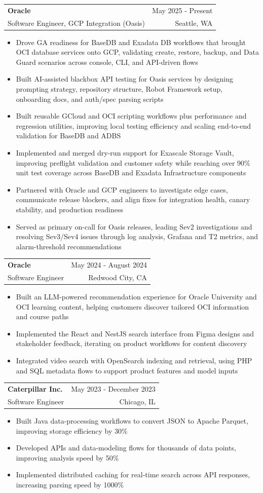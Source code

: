 \documentclass[letterpaper,11pt]{article}
\makeatletter
\newcommand{\resumeItem}[1]{
  \item\small{
    {#1 \vspace{-1pt}}
  }
}
\newcommand{\resumeSubheading}[4]{
  \vspace{-2pt}\item
    \begin{tabular*}{0.97\textwidth}[t]{l@{\extracolsep{\fill}}r}
      \textbf{#1} & #2 \\
      {\small#3} & {\small #4} \\
    \end{tabular*}\vspace{-7pt}
}
\newcommand{\resumeItemListStart}{\begin{itemize}[leftmargin=0.18in,itemsep=1pt,topsep=2pt]}
\newcommand{\resumeItemListEnd}{\end{itemize}\vspace{-5pt}}
\makeatother
\begin{document}
    \resumeSubheading
  {Oracle}{May 2025 - Present}
  {Software Engineer, GCP Integration (Oasis)}{Seattle, WA}
  \resumeItemListStart
    \resumeItem{Drove GA readiness for BaseDB and Exadata DB workflows that brought OCI database services onto GCP, validating create, restore, backup, and Data Guard scenarios across console, CLI, and API-driven flows}
    \resumeItem{Built AI-assisted blackbox API testing for Oasis services by designing prompting strategy, repository structure, Robot Framework setup, onboarding docs, and auth/spec parsing scripts}
    \resumeItem{Built reusable GCloud and OCI scripting workflows plus performance and regression utilities, improving local testing efficiency and scaling end-to-end validation for BaseDB and ADBS}
    \resumeItem{Implemented and merged dry-run support for Exascale Storage Vault, improving preflight validation and customer safety while reaching over 90\% unit test coverage across BaseDB and Exadata Infrastructure components}
    \resumeItem{Partnered with Oracle and GCP engineers to investigate edge cases, communicate release blockers, and align fixes for integration health, canary stability, and production readiness}
    \resumeItem{Served as primary on-call for Oasis releases, leading Sev2 investigations and resolving Sev3/Sev4 issues through log analysis, Grafana and T2 metrics, and alarm-threshold recommendations}
  \resumeItemListEnd

    \resumeSubheading
      {Oracle}{May 2024 - August 2024}
      {Software Engineer}{Redwood City, CA}
      \resumeItemListStart
        \resumeItem{Built an LLM-powered recommendation experience for Oracle University and OCI learning content, helping customers discover tailored OCI information and course paths}
        \resumeItem{Implemented the React and NestJS search interface from Figma designs and stakeholder feedback, iterating on product workflows for content discovery}
        \resumeItem{Integrated video search with OpenSearch indexing and retrieval, using PHP and SQL metadata flows to support product features and model inputs}
      \resumeItemListEnd

    \resumeSubheading
      {Caterpillar Inc.}{May 2023 - December 2023}
      {Software Engineer}{Chicago, IL}
      \resumeItemListStart
        \resumeItem{Built Java data-processing workflows to convert JSON to Apache Parquet, improving storage efficiency by 30\%}
        \resumeItem{Developed APIs and data-modeling flows for thousands of data points, improving analysis speed by 50\%}
        \resumeItem{Implemented distributed caching for real-time search across API responses, increasing parsing speed by 1000\%}
      \resumeItemListEnd
\end{document}
